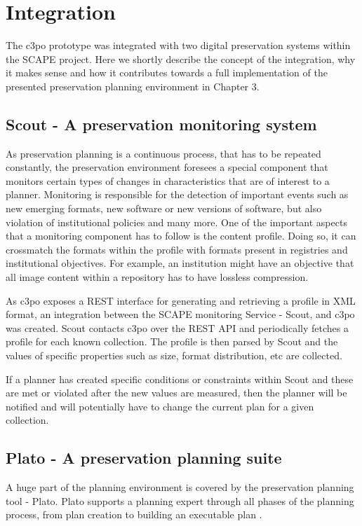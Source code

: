 \section{Integration}
The c3po prototype was integrated with two digital preservation systems within the SCAPE project. Here we shortly describe the concept of the integration, why it makes sense and how it contributes towards a full implementation of the presented preservation planning environment in Chapter 3.

\subsection{Scout - A preservation monitoring system}
As preservation planning is a continuous process, that has to be repeated constantly, the preservation environment
foresees a special component that monitors certain types of changes in characteristics that are of interest to a planner.
Monitoring is responsible for the detection of important events such as new emerging formats, new software or new versions of software, but also violation of institutional policies and many more. 
One of the important aspects that a monitoring component has to follow is the content profile. Doing so, it can crossmatch the formats within the profile with formats present in registries and institutional objectives. For example, an institution might have an objective that all image content within a repository has to have lossless compression.

As c3po exposes a REST interface for generating and retrieving a profile in XML format, an integration between the SCAPE monitoring Service - Scout, and c3po was created. Scout contacts c3po over the REST API and periodically fetches a profile for each known collection. The profile is then parsed by Scout and the values of specific properties such as size, format distribution, etc are collected.

If a planner has created specific conditions or constraints within Scout and these are met or violated after the new values are measured, then the planner will be notified and will potentially have to change the current plan for a given collection.

\subsection{Plato - A preservation planning suite}
A huge part of the planning environment is covered by the preservation planning tool - Plato.
Plato supports a planning expert through all phases of the planning process, from plan creation to building an executable plan .

